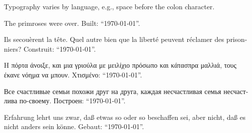 \documentclass[a4paper]{article}
\begin{document}
Typography varies by language, e.g., space before the colon character.

The primroses were over.
Built: \enquote{\today}.

\begin{french}
Ils secouèrent la tête.
Quel autre bien que la liberté peuvent réclamer des prisonniers?
Construit: \enquote{\today}.
\end{french}

\begin{greek}
Η πόρτα άνοιξε, και μια γριούλα με μειλίχιο πρόσωπο και κάτασπρα
μαλλιά, τους έκανε νόημα να μπουν.
Χτισμένο: \enquote{\today}.
\end{greek}

\begin{russian}
Все счастливые семьи похожи друг на друга,
каждая несчастливая семья несчастлива по-своему.
Построен: \enquote{\today}.
\end{russian}

Erfahrung lehrt uns zwar, daß etwas so oder so beschaffen sei,
aber nicht, daß es nicht anders sein könne.
Gebaut: \enquote{\today}.
\end{document}
